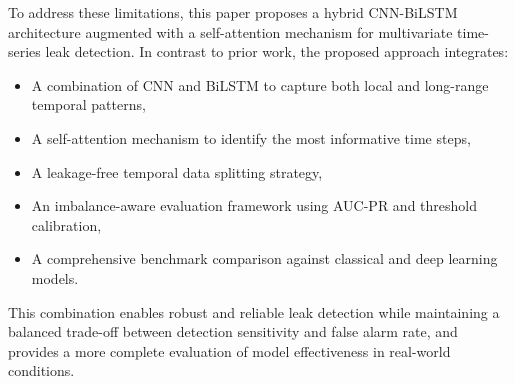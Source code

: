 To address these limitations, this paper proposes a hybrid CNN-BiLSTM architecture
augmented with a self-attention mechanism for multivariate time-series leak
detection. In contrast to prior work, the proposed approach integrates:

\begin{itemize}
    \item A combination of CNN and BiLSTM to capture both local and long-range temporal patterns,
    \item A self-attention mechanism to identify the most informative time steps,
    \item A leakage-free temporal data splitting strategy,
    \item An imbalance-aware evaluation framework using AUC-PR and threshold calibration,
    \item A comprehensive benchmark comparison against classical and deep learning models.
\end{itemize}

This combination enables robust and reliable leak detection while maintaining a
balanced trade-off between detection sensitivity and false alarm rate, and
provides a more complete evaluation of model effectiveness in real-world
conditions.